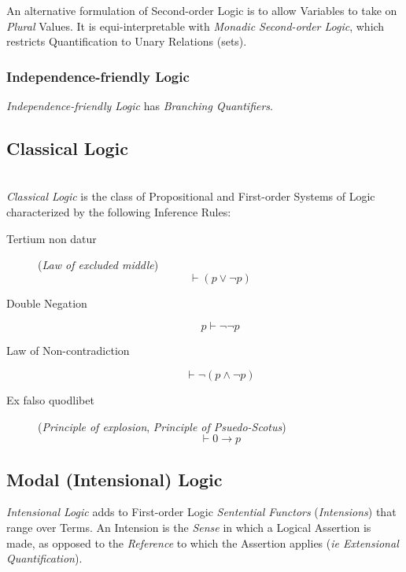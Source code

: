 \documentclass{article}
\begin{document}
An alternative formulation of Second-order Logic is to allow Variables
to take on \emph{Plural} Values. It is equi-interpretable with
\emph{Monadic Second-order Logic}, which restricts Quantification to
Unary Relations (sets).

\subsubsection{Independence-friendly Logic}\label{subsec:independence_logic}

\emph{Independence-friendly Logic} has \emph{Branching Quantifiers}.

\subsection{Classical Logic}\label{subsec:classical_logic} \hfill
\\ \emph{Classical Logic} is the class of Propositional and
First-order Systems of Logic characterized by the following Inference
Rules:

\begin{description}

\item [Tertium non datur] (\emph{Law of excluded middle})
    \[\vdash(p \vee \neg p)\]

\item [Double Negation]
    \[p \vdash \neg\neg p\]

\item [Law of Non-contradiction]
    \[\vdash \neg(p \wedge \neg p)\]

\item [Ex falso quodlibet] (\emph{Principle of explosion},
  \emph{Principle of Psuedo-Scotus})
    \[\vdash 0 \rightarrow p\]


\end{description}

\subsection{Modal (Intensional) Logic} \label{subsec:modal_logic}

\emph{Intensional Logic} adds to First-order Logic \emph{Sentential
  Functors} (\emph{Intensions}) that range over Terms. An Intension is
the \emph{Sense} in which a Logical Assertion is made, as opposed to
the \emph{Reference} to which the Assertion applies (\emph{ie
  Extensional Quantification}).
\end{document}
